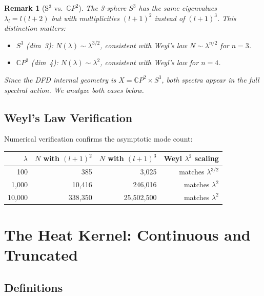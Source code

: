\documentclass[12pt,a4paper]{article}
\newtheorem{remark}{Remark}
\begin{document}
\begin{remark}[S$^3$ vs.\ $\mathbb{C}P^2$]
\label{rem:S3-vs-CP2}
The 3-sphere $S^3$ has the same eigenvalues $\lambda_l = l(l+2)$ but with
multiplicities $(l+1)^2$ instead of $(l+1)^3$.  This distinction matters:
\begin{itemize}
\item $S^3$ (dim~3): $N(\lambda) \sim \lambda^{3/2}$, consistent with
  Weyl's law $N \sim \lambda^{n/2}$ for $n = 3$.
\item $\mathbb{C}P^2$ (dim~4): $N(\lambda) \sim \lambda^2$, consistent
  with Weyl's law for $n = 4$.
\end{itemize}
Since the DFD internal geometry is $X = \mathbb{C}P^2 \times S^3$,
\emph{both} spectra appear in the full spectral action.  We analyze
both cases below.
\end{remark}

\subsection{Weyl's Law Verification}

Numerical verification confirms the asymptotic mode count:

\begin{center}
\begin{tabular}{rrrr}
\toprule
$\lambda$ & $N$ with $(l+1)^2$ & $N$ with $(l+1)^3$ & Weyl $\lambda^2$ scaling \\
\midrule
100   & 385     & 3,025    & matches $\lambda^{3/2}$ \\
1,000 & 10,416  & 246,016  & matches $\lambda^2$ \\
10,000& 338,350 & 25,502,500 & matches $\lambda^2$ \\
\bottomrule
\end{tabular}
\end{center}

\section{The Heat Kernel: Continuous and Truncated}
\label{sec:heat-kernel}

\subsection{Definitions}
\end{document}
